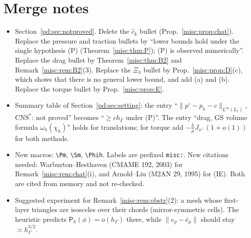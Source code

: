 \documentclass[11pt,reqno]{amsart}
\theoremstyle{plain}
\theoremstyle{definition}
\newcommand{\hG}{h_\Gamma}
\newcommand{\norm}[1]{\lVert #1\rVert}
\newcommand{\CNS}{\mathrm{CNS}^\ast}
\newcommand{\Lay}{L_1}
\newcommand{\chat}{\hat c_k}
\newcommand{\Pm}{\mathsf P_h}     %
\newcommand{\Sm}{\mathsf S_h}     %
\newcommand{\Phih}{\Phi_h}        %
\begin{document}
\section{Merge notes}

\begin{itemize}
\item Section~\ref{pd:sec:notproved}. Delete the $\chat$ bullet (Prop.~\ref{misc:prop:chat}). Replace the pressure and traction bullets by ``lower bounds hold under the single hypothesis (P) (Theorem~\ref{misc:thm:P}); (P) is observed numerically''. Replace the drag bullet by Theorem~\ref{misc:thm:B2} and Remark~\ref{misc:rem:B2}(3). Replace the $\Xi_h$ bullet by Prop.~\ref{misc:prop:D}(c), which shows that there is no general lower bound, and add (a) and (b). Replace the torque bullet by Prop.~\ref{misc:prop:E}.
\item Summary table of Section~\ref{pd:sec:setting}: the entry ``$\norm{p^\circ-p_h-c}_{L^\infty(\Lay)}$, $\CNS$: not proved'' becomes ``$\ge c\hG$ under (P)''. The entry ``drag, GS volume formula $\omega_h(\chi_h)$'' holds for translations; for torque add $-\frac h\mu J_{x^\perp}(1+o(1))$ for both methods.
\item New macros: \verb|\Pm|, \verb|\Sm|, \verb|\Phih|. Labels are prefixed \texttt{misc:}. New citations needed: Warburton--Hesthaven (CMAME 192, 2003) for Remark~\ref{misc:rem:chat}(i), and Arnold--Liu (M2AN 29, 1995) for (IE). Both are cited from memory and not re-checked.
\item Suggested experiment for Remark~\ref{misc:rem:obstr}(2): a mesh whose first-layer triangles are isosceles over their chords (mirror-symmetric cells). The heuristic predicts $\Pm(\phi)=o(\hG)$ there, while $\norm{e_p-\bar e_p}$ should stay $\asymp\hG^{3/2}$.
\end{itemize}
\end{document}
